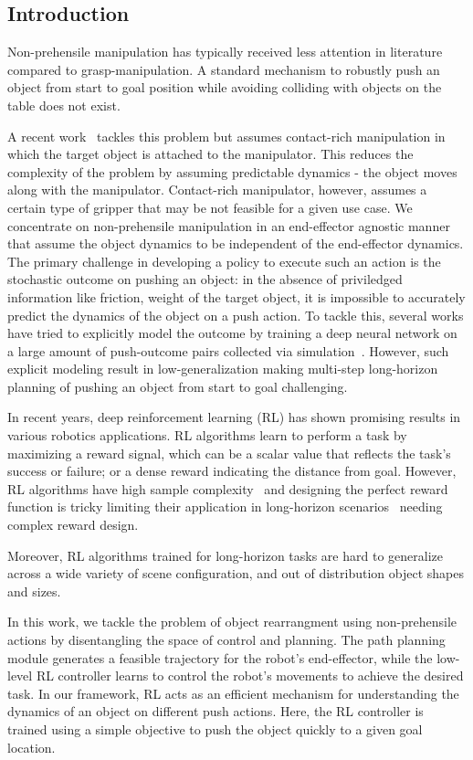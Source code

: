 \subsection{Introduction}
 Non-prehensile manipulation has typically received less attention in literature compared to grasp-manipulation. A standard mechanism to robustly push an object from start to goal position while avoiding colliding with objects on the table does not exist. 

A recent work~\cite{iros2022} tackles this problem but assumes contact-rich manipulation in which the target object is attached to the manipulator. This reduces the complexity of the problem by assuming predictable dynamics - the object moves along with the manipulator. Contact-rich manipulator, however, assumes a certain type of gripper that may be not feasible for a given use case.  We concentrate on non-prehensile manipulation in an end-effector agnostic manner that assume the object dynamics to be independent of the end-effector dynamics. The primary challenge in developing a policy to execute such an action is the stochastic outcome on pushing an object: in the absence of priviledged information like friction, weight of the target object, it is impossible to accurately predict the dynamics of the object on a push action. To tackle this, several works have tried to explicitly model the outcome by training a deep neural network on a large amount of push-outcome pairs collected via simulation~\cite{huang2021dipn, huang2021visual, bai2021hierarchical-more}. However, such explicit modeling result in low-generalization making multi-step long-horizon planning of pushing an object from start to goal challenging. 

In recent years, deep reinforcement learning (RL) has shown promising results in various robotics applications. RL algorithms learn to perform a task by maximizing a reward signal, which can be a scalar value that reflects the task's success or failure; or a dense reward indicating the distance from goal. However, RL algorithms have high sample complexity~\cite{rl_sample_complexitiy} and designing the perfect reward function is tricky limiting their application in long-horizon scenarios~\cite{rl_long_horizon} needing complex reward design. 

Moreover, RL algorithms trained for long-horizon tasks are hard to generalize across a wide variety of scene configuration, and out of distribution object shapes and sizes.

In this work, we tackle the problem of object rearrangment using non-prehensile actions by disentangling the space of control and planning. The path planning module generates a feasible trajectory for the robot's end-effector, while the low-level RL controller learns to control the robot's movements to achieve the desired task. In our framework, RL acts as an efficient mechanism for understanding the dynamics of an object on different push actions. Here, the RL controller is trained using a simple objective to push the object quickly to a given goal location. 

